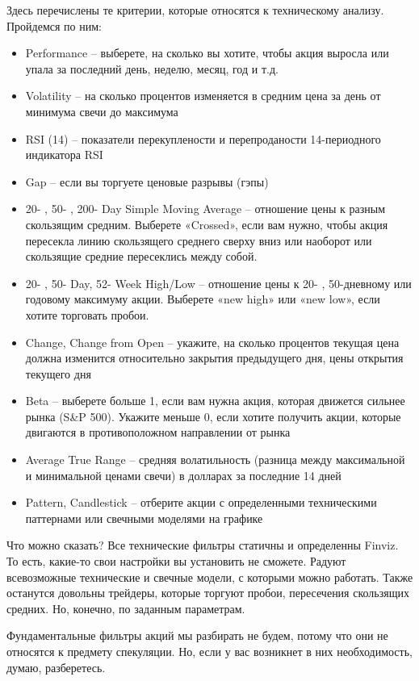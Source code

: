 \documentclass[a5paper]{article}
\begin{document}
Здесь перечислены те критерии, которые относятся к техническому анализу. Пройдемся по ним:
\begin{itemize}
\item     Performance – выберете, на сколько вы хотите, чтобы акция выросла или упала за последний день, неделю, месяц, год и т.д.
\item     Volatility – на сколько процентов изменяется в средним цена за день от минимума свечи до максимума
\item     RSI (14) – показатели перекуплености и перепроданости 14-периодного индикатора RSI
\item     Gap – если вы торгуете ценовые разрывы (гэпы)
\item     20- , 50- , 200- Day Simple Moving Average – отношение цены к разным скользящим средним. Выберете «Crossed», если вам нужно, чтобы акция пересекла линию скользящего среднего сверху вниз или наоборот или скользящие средние пересеклись между собой.
\item     20- , 50- Day, 52- Week High/Low – отношение цены к 20- , 50-дневному или годовому максимуму акции. Выберете «new high» или «new low», если хотите торговать пробои.
\item     Change, Change from Open – укажите, на сколько процентов текущая цена должна изменится относительно закрытия предыдущего дня, цены открытия текущего дня
\item      Beta – выберете больше 1, если вам нужна акция, которая движется сильнее рынка (S\&P 500). Укажите меньше 0, если хотите получить акции, которые двигаются в противоположном направлении от рынка
\item     Average True Range – средняя волатильность (разница между максимальной и минимальной ценами свечи) в долларах за последние 14 дней
\item     Pattern, Candlestick – отберите акции с определенными техническими паттернами или свечными моделями на графике
\end{itemize}

Что можно сказать? Все технические фильтры статичны и определенны Finviz. То есть, какие-то свои настройки вы установить не сможете. Радуют всевозможные технические и свечные модели, с которыми можно работать. Также останутся довольны трейдеры, которые торгуют пробои, пересечения скользящих средних. Но, конечно, по заданным параметрам.

Фундаментальные фильтры акций мы разбирать не будем, потому что они не
относятся к предмету спекуляции. Но, если у вас возникнет в них
необходимость, думаю, разберетесь.
\end{document}
